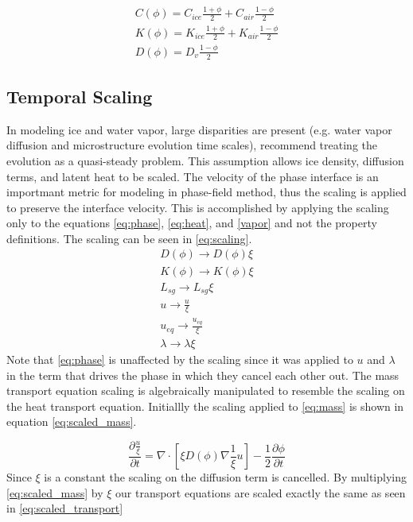 \documentclass[twoside]{article}
\begin{document}
\begin{multicols}{2}
\begin{subequations} \label{eq:coefficients}
\begin{align}
	C(\phi) = C_{ice} \frac{1+\phi}{2} + C_{air} \frac{1-\phi}{2} \\
	K(\phi) = K_{ice} \frac{1+\phi}{2} + K_{air} \frac{1-\phi}{2} \\
	D(\phi) = D_{v} \frac{1-\phi}{2} \label{diffusion_coefficient}
\end{align}
\end{subequations}

\subsection{Temporal Scaling}
In modeling ice and water vapor, large disparities are present (e.g. water vapor diffusion and microstructure evolution time scales), \cite{Plapp_2009} recommend treating the evolution as a quasi-steady problem. This assumption allows ice density, diffusion terms, and latent heat to be scaled. The velocity of the phase interface is an importmant metric for modeling in phase-field method, thus the scaling is applied to preserve the interface velocity. This is accomplished by applying the scaling only to the equations \eqref{eq:phase}, \eqref{eq:heat}, and \eqref{vapor} and not the property definitions. The scaling can be seen in \eqref{eq:scaling}.
\begin{subequations} \label{eq:scaling}
\begin{align}
	D(\phi) \rightarrow D(\phi) \xi \\ 
	K(\phi) \rightarrow K(\phi)\xi  \\
	L_{sg} \rightarrow L_{sg}\xi  \\
	u \rightarrow \frac{u}{\xi}  \\
	u_{eq} \rightarrow \frac{u_{eq}}{\xi}  \\
	\lambda \rightarrow \lambda \xi
\end{align}
\end{subequations}
Note that \eqref{eq:phase} is unaffected by the scaling since it was applied to $u$ and $\lambda$ in the term that drives the phase in which they cancel each other out.  The mass transport equation scaling is algebraically manipulated to resemble the scaling on the heat transport equation. Initiallly the scaling applied to \eqref{eq:mass} is shown in equation \eqref{eq:scaled_mass}. 

\begin{equation}
\frac{\partial \frac{u}{\xi}}{\partial t} = \nabla \cdot[ \xi D(\phi) \nabla \frac{1}{\xi}u] - \frac{ 1}{2}\frac{\partial \phi}{\partial t}
\end{equation}
Since $\xi$ is a constant the scaling on the diffusion term is cancelled. By multiplying \eqref{eq:scaled_mass} by $\xi$ our transport equations are scaled exactly the same as seen in \eqref{eq:scaled_transport}


\end{multicols}
\end{document}
